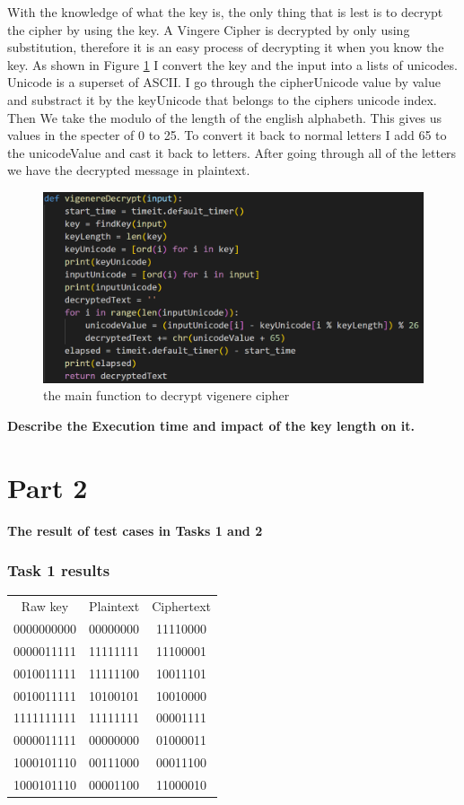 \documentclass[12pt, letterpaper]{article}
\begin{document}
With the knowledge of what the key is, the only thing that is lest is to decrypt the cipher by using the key. A Vingere Cipher is decrypted by only using substitution, therefore it is an easy process of decrypting it when you know the key. As shown in Figure \ref{fig:vigenereDecrypt} I convert the key and the input into a lists of unicodes. Unicode is a superset of ASCII. I go through the cipherUnicode value by value and substract it by the keyUnicode that belongs to the ciphers unicode index. Then We take the modulo of the length of the english alphabeth. This gives us values in the specter of 0 to 25. To convert it back to normal letters I add 65 to the unicodeValue and cast it back to letters. After going through all of the letters we have the decrypted message in plaintext.

\begin{figure}[H]
  \includegraphics[width=\linewidth]{code_snippets/vigenereDecrypt.PNG}
  \caption{the main function to decrypt vigenere cipher}
  \label{fig:vigenereDecrypt}
\end{figure} 

\textbf{Describe the Execution time and impact of the key length on it.}


\section*{Part 2}
\textbf{The result of test cases in Tasks 1 and 2}

\subsubsection*{Task 1 results}
\begin{center}
\begin{tabular}{ |c|c|c| } 
 \hline
 Raw key & Plaintext & Ciphertext \\
 0000000000 & 00000000 & 11110000 \\ 
 0000011111 & 11111111 & 11100001 \\ 
 0010011111 & 11111100 & 10011101 \\ 
 0010011111 & 10100101 & 10010000 \\ 
 1111111111 & 11111111 & 00001111 \\
 0000011111 & 00000000 & 01000011 \\
 1000101110 & 00111000 & 00011100 \\
 1000101110 & 00001100 & 11000010 \\
 \hline
\end{tabular}
\end{center}
\end{document}
